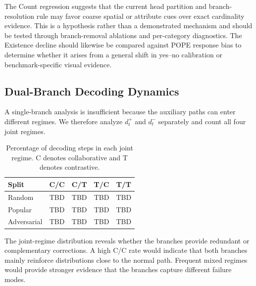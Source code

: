 The Count regression suggests that the current head partition and branch-resolution rule may favor coarse spatial or attribute cues over exact cardinality evidence. This is a hypothesis rather than a demonstrated mechanism and should be tested through branch-removal ablations and per-category diagnostics. The Existence decline should likewise be compared against POPE response bias to determine whether it arises from a general shift in yes--no calibration or benchmark-specific visual evidence.

\subsection{Dual-Branch Decoding Dynamics}

A single-branch analysis is insufficient because the auxiliary paths can enter different regimes. We therefore analyze $d_t^{+}$ and $d_t^{-}$ separately and count all four joint regimes.

\begin{table}[t]
\centering
\small
\setlength{\tabcolsep}{3pt}
\caption{Branch-specific TVD statistics under ADBD.}
\label{tab:tvd_stats}
\end{table}

\begin{table}[t]
\centering
\small
\begin{tabular}{lcccc}
\toprule
Split & C/C & C/T & T/C & T/T \\
\midrule
Random & TBD & TBD & TBD & TBD \\
Popular & TBD & TBD & TBD & TBD \\
Adversarial & TBD & TBD & TBD & TBD \\
\bottomrule
\end{tabular}
\caption{Percentage of decoding steps in each joint regime. C denotes collaborative and T denotes contrastive.}
\label{tab:regime_stats}
\end{table}

The joint-regime distribution reveals whether the branches provide redundant or complementary corrections. A high C/C rate would indicate that both branches mainly reinforce distributions close to the normal path. Frequent mixed regimes would provide stronger evidence that the branches capture different failure modes. 

